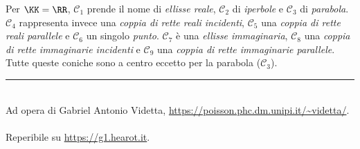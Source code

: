 \documentclass[10pt,landscape]{article}
\begin{document}
\begin{multicols}{3}
		Per $\KK=\RR$, $\mathcal{C}_1$ prende il nome di \textit{ellisse reale}, $\mathcal{C}_2$
		di \textit{iperbole} e $\mathcal{C}_3$ di \textit{parabola}. $\mathcal{C}_4$ rappresenta invece una
		\textit{coppia di rette reali incidenti}, $\mathcal{C}_5$ una \textit{coppia di rette
		reali parallele} e $\mathcal{C}_6$ un singolo \textit{punto}. $\mathcal{C}_7$ è
		una \textit{ellisse immaginaria}, $\mathcal{C}_8$ una \textit{coppia di rette
		immaginarie incidenti} e $\mathcal{C}_9$ una \textit{coppia di rette immaginarie
		parallele}. Tutte queste coniche sono a centro eccetto per la parabola
		($\mathcal{C}_3$).
		
		\vfill
		\hrule
		~\\
		Ad opera di Gabriel Antonio Videtta, \url{https://poisson.phc.dm.unipi.it/~videtta/}.
		~\\Reperibile su
		\url{https://g1.hearot.it}.
	\end{multicols}
	
\end{document}
